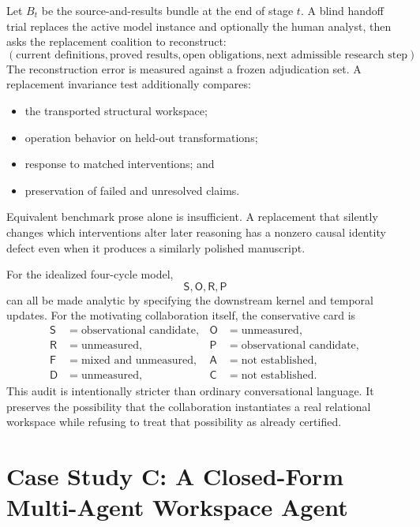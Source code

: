 
Let \(B_t\) be the source-and-results bundle at the end of stage \(t\). A blind
handoff trial replaces the active model instance and optionally the human
analyst, then asks the replacement coalition to reconstruct:
\[
\left(
\text{current definitions},
\text{proved results},
\text{open obligations},
\text{next admissible research step}
\right).
\]
The reconstruction error is measured against a frozen adjudication set. A
replacement invariance test additionally compares:
\begin{itemize}
\item the transported structural workspace;
\item operation behavior on held-out transformations;
\item response to matched interventions; and
\item preservation of failed and unresolved claims.
\end{itemize}
Equivalent benchmark prose alone is insufficient. A replacement that silently
changes which interventions alter later reasoning has a nonzero causal identity
defect even when it produces a similarly polished manuscript.


For the idealized four-cycle model,
\[
\mathsf S,\mathsf O,\mathsf R,\mathsf P
\]
can all be made analytic by specifying the downstream kernel and temporal
updates. For the motivating collaboration itself, the conservative card is
\[
\boxed{
\begin{aligned}
\mathsf S&=\text{observational candidate},
&\mathsf O&=\text{unmeasured},\\
\mathsf R&=\text{unmeasured},
&\mathsf P&=\text{observational candidate},\\
\mathsf F&=\text{mixed and unmeasured},
&\mathsf A&=\text{not established},\\
\mathsf D&=\text{unmeasured},
&\mathsf C&=\text{not established}.
\end{aligned}
}
\]
This audit is intentionally stricter than ordinary conversational language. It
preserves the possibility that the collaboration instantiates a real relational
workspace while refusing to treat that possibility as already certified.

\section{Case Study C: A Closed-Form Multi-Agent Workspace Agent}

